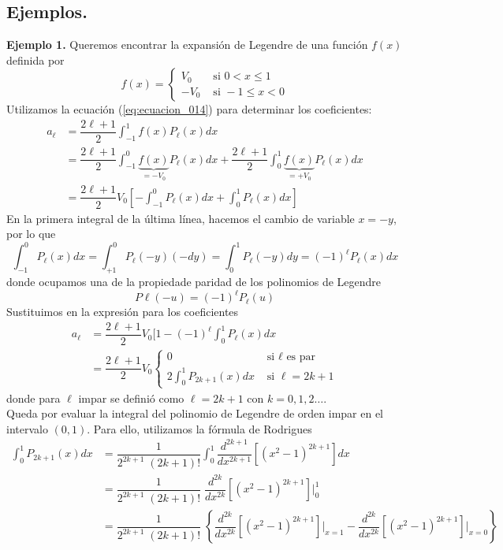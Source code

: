 \subsection{Ejemplos.}
\textbf{Ejemplo 1.} Queremos encontrar la expansión de Legendre de una función $f(x)$ definida por
\[ f(x) = \begin{cases}
V_{0} & \mbox{ si } 0 < x \leq 1 \\
- V_{0} & \mbox{ si } -1 \leq x < 0
\end{cases} \]
Utilizamos la ecuación (\ref{eq:ecuacion_014}) para determinar los coeficientes:
\[ \begin{split}
a_{\ell} &= \dfrac{2 \ell + 1}{2} \int_{-1}^{1} f(x) P_{\ell} (x) dx \\
&= \dfrac{2 \ell + 1}{2} \int_{-1}^{0} \underbrace{f(x)}_{=-V_0}  P_{\ell} (x) dx + \dfrac{2 \ell + 1}{2} \int_{0}^{1} \underbrace{f(x)}_{=+V_0}  P_{\ell} (x) dx \\
&= \dfrac{2 \ell + 1}{2} V_{0} \left[ - \int_{-1}^{0} P_{\ell} (x) dx + \int_{0}^{1} P_{\ell} (x) dx \right]
\end{split}\]
En la primera integral de la última línea, hacemos el cambio de variable $x = -y$, por lo que
\[ \int_{-1}^{0} P_{\ell} (x) dx = \int_{+1}^{0} P_{\ell} (-y) (-dy) = \int_{0}^{1} P_{\ell} (-y) dy = (-1)^{\ell} P_{\ell} (x) dx \]
donde ocupamos una de la propiedade paridad de los polinomios de Legendre
\[ P{\ell} (-u) = (-1)^{\ell} P_{\ell} (u) \]
Sustituimos en la expresión para los coeficientes
\[  \begin{split}
a_{\ell} &= \dfrac{2 \ell + 1}{2} V_{0} [1 - (-1)^{\ell} \int_{0}^{1} P_{\ell} (x) dx \\
&= \dfrac{2 \ell + 1}{2} V_{0} \begin{cases}
0 & \mbox{ si } \ell \mbox{ es par} \\
2 \int_{0}^{1} P_{2 k + 1} (x) dx & \mbox{ si } \ell = 2 k + 1 
\end{cases}
\end{split} \]
donde para $\ell$ impar se definió como $\ell =  2k+1$ con $k=0,1,2\ldots$.
\\
Queda por evaluar la integral del polinomio de Legendre de orden impar en el intervalo $(0,1)$. Para ello, utilizamos la fórmula de Rodrigues
\[ \begin{split}
\int_{0}^{1} P_{2k+1} (x) dx &= \dfrac{1}{2^{2k+1} \; (2k +1)!} \int_{0}^{1} \dfrac{d^{2k+1}}{d x^{2k+1}} \left[ (x^{2} -1)^{2k+1} \right] dx \\
&= \dfrac{1}{2^{2k+1} \; (2k +1)!} \; \dfrac{d^{2k}}{d x^{2k}} \left[ (x^{2} - 1)^{2k+1} \right] \Bigr\lvert_{0}^{1} \\
&= \dfrac{1}{2^{2k+1} \; (2k +1)!} \; \left\lbrace \dfrac{d^{2k}}{d x^{2k}} \left[ (x^{2} - 1)^{2k+1} \right] \Bigr\lvert_{x=1} - \dfrac{d^{2k}}{d x^{2k}} \left[ (x^{2} - 1)^{2k+1} \right] \Bigr\lvert_{x=0} \right\rbrace
\end{split} \]
